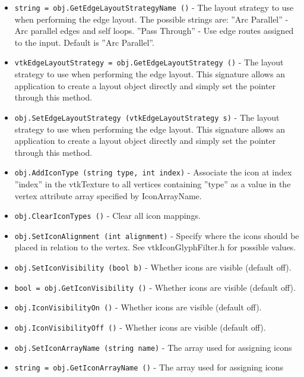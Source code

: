 \begin{itemize}
\item  \verb|string = obj.GetEdgeLayoutStrategyName ()| -  The layout strategy to use when performing the edge layout.
 The possible strings are:
   ''Arc Parallel''   - Arc parallel edges and self loops.
   ''Pass Through''   - Use edge routes assigned to the input.
 Default is ''Arc Parallel''.

\item  \verb|vtkEdgeLayoutStrategy = obj.GetEdgeLayoutStrategy ()| -  The layout strategy to use when performing the edge layout.
 This signature allows an application to create a layout
 object directly and simply set the pointer through this method.

\item  \verb|obj.SetEdgeLayoutStrategy (vtkEdgeLayoutStrategy s)| -  The layout strategy to use when performing the edge layout.
 This signature allows an application to create a layout
 object directly and simply set the pointer through this method.

\item  \verb|obj.AddIconType (string type, int index)| -  Associate the icon at index ''index'' in the vtkTexture to all vertices
 containing ''type'' as a value in the vertex attribute array specified by
 IconArrayName.

\item  \verb|obj.ClearIconTypes ()| -  Clear all icon mappings.

\item  \verb|obj.SetIconAlignment (int alignment)| -  Specify where the icons should be placed in relation to the vertex.
 See vtkIconGlyphFilter.h for possible values.

\item  \verb|obj.SetIconVisibility (bool b)| -  Whether icons are visible (default off).

\item  \verb|bool = obj.GetIconVisibility ()| -  Whether icons are visible (default off).

\item  \verb|obj.IconVisibilityOn ()| -  Whether icons are visible (default off).

\item  \verb|obj.IconVisibilityOff ()| -  Whether icons are visible (default off).

\item  \verb|obj.SetIconArrayName (string name)| -  The array used for assigning icons

\item  \verb|string = obj.GetIconArrayName ()| -  The array used for assigning icons


\end{itemize}
